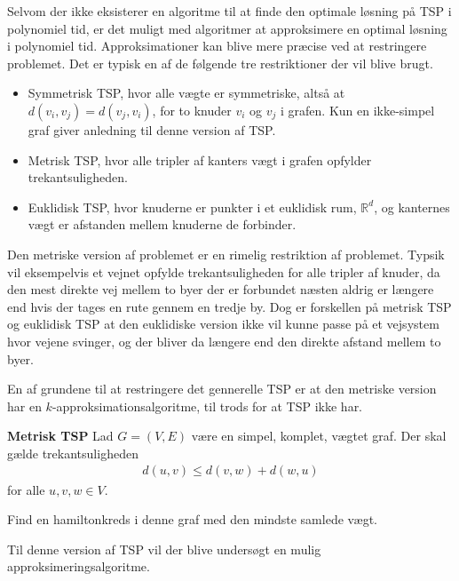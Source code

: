 Selvom der ikke eksisterer en algoritme til at finde den optimale løsning på TSP i polynomiel tid, er det muligt med algoritmer at approksimere en optimal løsning i polynomiel tid. Approksimationer kan blive mere præcise ved at restringere problemet.
Det er typisk en af de følgende tre restriktioner der vil blive brugt. 
\begin{itemize}[noitemsep]
	\item Symmetrisk TSP, hvor alle vægte er symmetriske, altså at $d(v_i, v_j) = d(v_j, v_i)$, for to knuder $v_i$ og $v_j$ i grafen. Kun en ikke-simpel graf giver anledning til denne version af TSP.
	\item Metrisk TSP, hvor alle tripler af kanters vægt i grafen opfylder trekantsuligheden.
	\item Euklidisk TSP, hvor knuderne er punkter i et euklidisk rum, ${\mathbb{R}}^d$, og kanternes vægt er afstanden mellem knuderne de forbinder.
\end{itemize}

Den metriske version af problemet er en rimelig restriktion af problemet.
Typsik vil eksempelvis et vejnet opfylde trekantsuligheden for alle tripler af knuder, da den mest direkte vej mellem to byer der er forbundet næsten aldrig er længere end hvis der tages en rute gennem en tredje by.
Dog er forskellen på metrisk TSP og euklidisk TSP at den euklidiske version ikke vil kunne passe på et vejsystem hvor vejene svinger, og der bliver da længere end den direkte afstand mellem to byer.

En af grundene til at restringere det gennerelle TSP er at den metriske version har en $k$-approksimationsalgoritme, til trods for at TSP ikke har.

\begin{tcolorbox}
	\textbf{Metrisk TSP} \quad Lad $G=(V,E)$ være en simpel, komplet, vægtet graf. Der skal gælde trekantsuligheden
	\begin{align*}
		d(u,v) \leq d(v,w) + d(w,u)
	\end{align*}
	for alle $u,v,w \in V$.

	Find en hamiltonkreds i denne graf med den mindste samlede vægt.
\end{tcolorbox}

Til denne version af TSP vil der blive undersøgt en mulig approksimeringsalgoritme.
